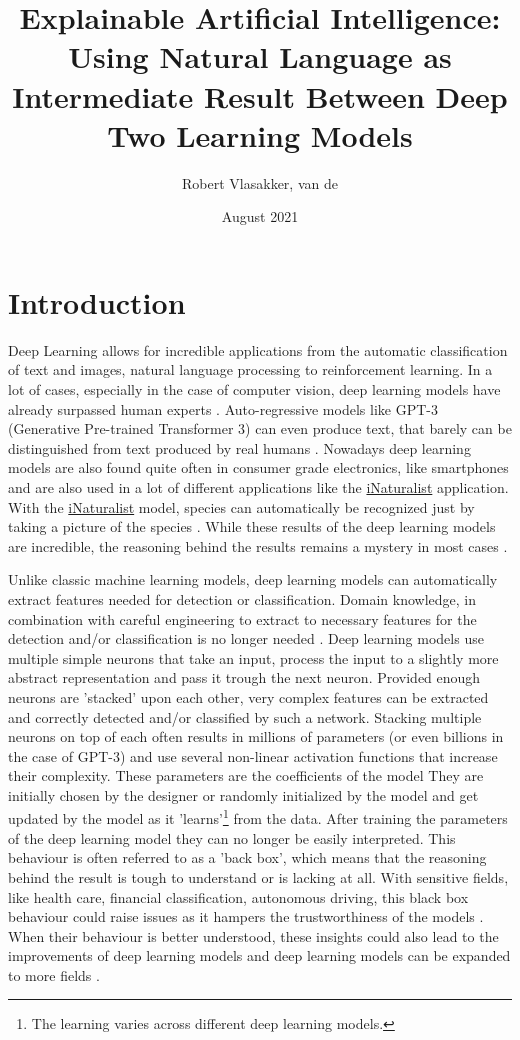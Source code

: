 \documentclass{article}
\title{Explainable Artificial Intelligence: Using Natural Language as Intermediate Result Between Deep Two Learning Models}
\author{Robert Vlasakker, van de}
\date{August 2021}
\begin{document}
\maketitle

\section{Introduction}
Deep Learning allows for incredible applications from the automatic classification of text and images, natural language processing to reinforcement learning.
In a lot of cases, especially in the case of computer vision, deep learning models have already surpassed human experts \cite{he_delving_2015}.
Auto-regressive models like GPT-3 (Generative Pre-trained Transformer 3) can even produce text, that barely can be distinguished from text produced by real humans \cite{brown_language_2020}.
Nowadays deep learning models are also found quite often in consumer grade electronics, like smartphones and are also used in a lot of different applications like the \href{https://www.inaturalist.org/}{iNaturalist} application.
With the \href{https://www.inaturalist.org/}{iNaturalist} model, species can automatically be recognized just by taking a picture of the species \cite{radford_learning_2021}.
While these results of the deep learning models are incredible, the reasoning behind the results remains a mystery in most cases \cite{li_interpretable_2021, losch_interpretability_2019}.

Unlike classic machine learning models, deep learning models can automatically extract features needed for detection or classification.
Domain knowledge, in combination with careful engineering to extract to necessary features for the detection and/or classification is no longer needed \cite{lecun_deep_2015}.
Deep learning models use multiple simple neurons that take an input, process the input to a slightly more abstract representation and pass it trough the next neuron.
Provided enough neurons are 'stacked' upon each other, very complex features can be extracted and correctly detected and/or classified by such a network.
Stacking multiple neurons on top of each often results in millions of parameters (or even billions in the case of GPT-3) and use several non-linear activation functions that increase their complexity.
These parameters are the coefficients of the model
They are initially chosen by the designer or randomly initialized by the model and get updated by the model as it 'learns'\footnote{The learning varies across different deep learning models.} from the data.
After training the parameters of the deep learning model they can no longer be easily interpreted.
This behaviour is often referred to as a 'back box', which means that the reasoning behind the result is tough to understand or is lacking at all.
With sensitive fields, like health care, financial classification, autonomous driving, this black box behaviour could raise issues as it hampers the trustworthiness of the models \cite{carvalho_machine_2019}.
When their behaviour is better understood, these insights could also lead to the improvements of deep learning models \cite{amershi_modeltracker_2015} and deep learning models can be expanded to more fields \cite{lei_opening_2018}.
\end{document}
